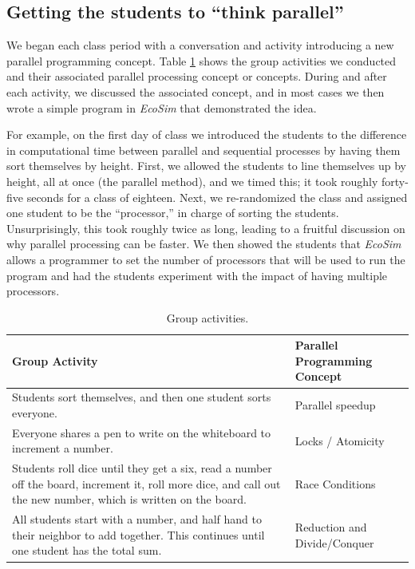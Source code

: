 \documentclass{sig-alternate}
\begin{document}
\subsection{Getting the students to ``think parallel''}
We began each class period with a conversation and activity introducing a new parallel programming concept.
Table \ref{tab:group-activities} shows the group activities we conducted and their associated
parallel processing concept or concepts.  
During and after each activity, we discussed the associated concept, 
and in most cases we then wrote a simple program in \emph{EcoSim} that demonstrated the idea.  
 
For example, on the first day of class we introduced the students to the difference in
computational time between parallel and sequential processes by having them sort themselves
by height.  First, we allowed the students to line themselves up by height, all at once (the
parallel method), and we timed this; it took roughly forty-five seconds for a class of eighteen.
Next, we re-randomized the class and assigned one student to be the ``processor,'' in charge
of sorting the students.  Unsurprisingly, this took roughly twice as long, 
leading to a fruitful discussion on why parallel processing can be faster.
We then showed the students that \emph{EcoSim} allows a programmer 
to set the number of processors that will be used to run the program
and had the students experiment with the impact of having multiple processors.

\begin{table}
\centering \begin{tabular}{p{.7\linewidth} | p{.25\linewidth}} 
\toprule
Group Activity               &  Parallel Programming Concept \\ \midrule
Students sort themselves, and then one student sorts everyone.     & Parallel speedup \\ \hline
Everyone shares a pen to write on the whiteboard to increment a number. & Locks / Atomicity  \\ \hline
Students roll dice until they get a six, read a number off the board, increment it, roll more dice, and call out the new number, which is written on the board.   & Race Conditions \\ \hline
All students start with a number, and half hand to their neighbor to add together.
This continues until one student has the total sum. & Reduction and Divide/Conquer  \\
\bottomrule 
\end{tabular}
\caption{Group activities.}
\label{tab:group-activities}
\end{table} 
\end{document}
